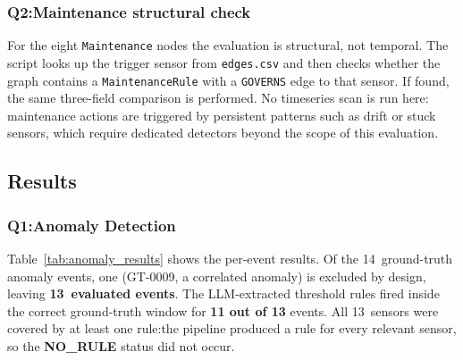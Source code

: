 ﻿\documentclass[11pt]{article}
\begin{document}
\subsubsection{Q2:Maintenance structural check}

For the eight \texttt{Maintenance} nodes the evaluation is structural, not
temporal.  The script looks up the trigger sensor from \texttt{edges.csv} and
then checks whether the graph contains a \texttt{MaintenanceRule} with a
\texttt{GOVERNS} edge to that sensor.  If found, the same three-field
comparison is performed.  No timeseries scan is run here: maintenance actions
are triggered by persistent patterns such as drift or stuck sensors, which
require dedicated detectors beyond the scope of this evaluation.

\subsection{Results}
\label{sec:layer4_results}

\subsubsection{Q1:Anomaly Detection}

Table~\ref{tab:anomaly_results} shows the per-event results.
Of the 14~ground-truth anomaly events, one (GT-0009, a correlated anomaly) is
excluded by design, leaving \textbf{13~evaluated events}.
The LLM-extracted threshold rules fired inside the correct ground-truth window
for \textbf{11 out of 13} events.
All 13~sensors were covered by at least one rule:the pipeline produced a
rule for every relevant sensor, so the \textbf{NO\_RULE} status did not occur.
\end{document}
